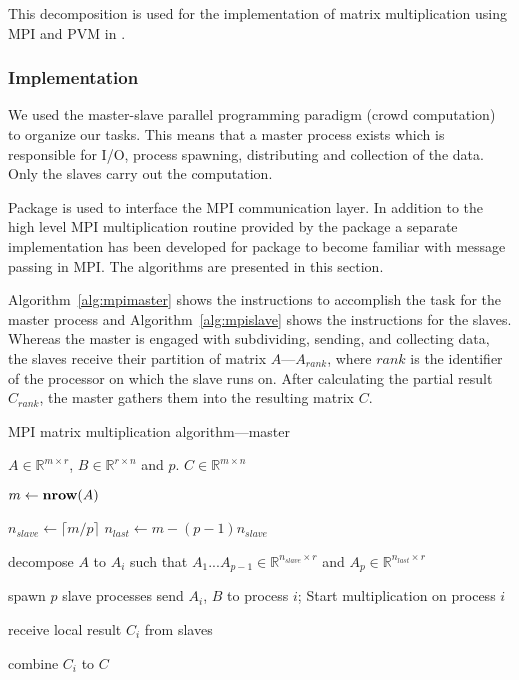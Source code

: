 This decomposition is used for the implementation of matrix
multiplication using MPI and PVM in .

\subsubsection{Implementation}

We used the master-slave parallel programming paradigm (crowd
computation) to organize our tasks. This means that a master process
exists which is responsible for I/O, process spawning, distributing
and collection of the data. Only the slaves carry out the
computation.

Package  is used to interface the MPI communication
layer. In addition to the high level MPI multiplication routine 
 provided by the package  a separate implementation has
been developed for package  to become familiar with message
passing in MPI. The algorithms are presented in this section.


Algorithm~\ref{alg:mpimaster} shows the instructions to accomplish the
task for the master process and Algorithm~\ref{alg:mpislave} shows the
instructions for the slaves. Whereas the master is engaged with
subdividing, sending, and collecting data, the slaves receive their
partition of matrix $A$---$A_{rank}$, where $rank$ is the identifier of
the processor on which the slave runs on. After calculating the
partial result $C_{rank}$, the master gathers them into the resulting
matrix $C$.  

\begin{algorithm}
\caption{MPI matrix multiplication algorithm---master}
\label{alg:mpimaster}
\begin{algorithmic}[1]

  \REQUIRE $A \in \mathbb{R}^{m \times r}$, $B \in \mathbb{R}^{r
    \times n}$ and $p$.
  \ENSURE $C \in \mathbb{R}^{m \times n}$

  \STATE $m \leftarrow \textbf{nrow} (A)$
  
  \STATE $n_{slave} \leftarrow \lceil m/p \rceil$
  \STATE $n_{last} \leftarrow m - (p - 1) n_{slave} $
  
  \STATE decompose $A$ to $A_i$ such that $A_1 ... A_{p-1} \in
  \mathbb{R}^{n_{slave} \times r}$ and $A_p \in \mathbb{R}^{n_{last} \times r} $  
  
  \STATE spawn $p$ slave processes
    \STATE send $A_i$, $B$ to process $i$; Start
    multiplication on process $i$ 
  \ENDFOR
  
    \STATE receive local result $C_{i}$ from slaves
  \ENDFOR
  
  \STATE combine $C_{i}$ to $C$

\end{algorithmic}
\end{algorithm}

